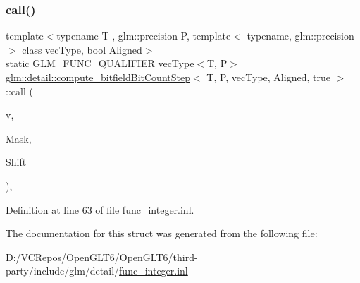 \subsubsection{\texorpdfstring{call()}{call()}}
{\footnotesize\ttfamily template$<$typename T , glm\+::precision P, template$<$ typename, glm\+::precision $>$ class vec\+Type, bool Aligned$>$ \\
static \mbox{\hyperlink{setup_8hpp_a33fdea6f91c5f834105f7415e2a64407}{G\+L\+M\+\_\+\+F\+U\+N\+C\+\_\+\+Q\+U\+A\+L\+I\+F\+I\+ER}} vec\+Type$<$T, P$>$ \mbox{\hyperlink{structglm_1_1detail_1_1compute__bitfield_bit_count_step}{glm\+::detail\+::compute\+\_\+bitfield\+Bit\+Count\+Step}}$<$ T, P, vec\+Type, Aligned, true $>$\+::call (\begin{DoxyParamCaption}\item[{vec\+Type$<$ T, P $>$ const \&}]{v,  }\item[{T}]{Mask,  }\item[{T}]{Shift }\end{DoxyParamCaption})\hspace{0.3cm}{\ttfamily [inline]}, {\ttfamily [static]}}



Definition at line 63 of file func\+\_\+integer.\+inl.



The documentation for this struct was generated from the following file\+:\begin{DoxyCompactItemize}
\item 
D\+:/\+V\+C\+Repos/\+Open\+G\+L\+T6/\+Open\+G\+L\+T6/third-\/party/include/glm/detail/\mbox{\hyperlink{func__integer_8inl}{func\+\_\+integer.\+inl}}\end{DoxyCompactItemize}
